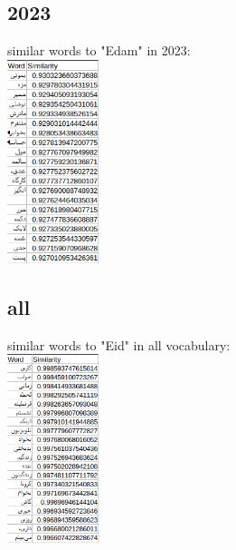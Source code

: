 \documentclass[a4paper]{article}
\begin{document}
\subsection{2023}
similar words to "Edam" in 2023:\\
\includegraphics[width=0.2\textwidth]{../reports/2023_report.png}\\
\subsection{all}
similar words to "Eid" in all vocabulary:\\
\includegraphics[width=0.2\textwidth]{../reports/all_report.png}\\

\bigskip

\pagebreak


\end{document}
